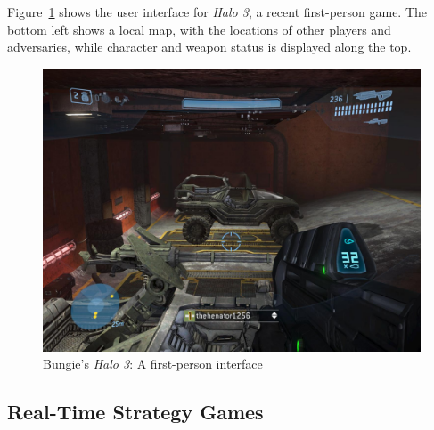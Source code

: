 Figure~\ref{fig:halo3} shows the user interface for \emph{Halo 3}, a recent first-person game. The bottom left shows a local map, with the locations of other players and adversaries, while character and weapon status is displayed along the top. 

\begin{figure}[ht]
\begin{center}
\includegraphics[width=5in]{images/halo3.jpg}
\caption{Bungie's \emph{Halo 3}: A first-person interface \label{fig:halo3}}
\end{center}
\end{figure}


\subsection{Real-Time Strategy Games} %
\label{sub:RTS_games}



